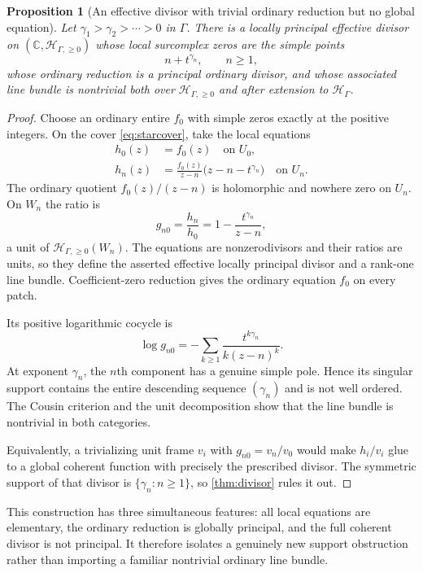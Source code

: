\documentclass[11pt,letterpaper]{article}
\newtheorem{proposition}[theorem]{Proposition}
\theoremstyle{definition}
\theoremstyle{remark}
\newcommand{\C}{\mathbb C}
\newcommand{\HH}{\mathscr H_\Gamma}
\newcommand{\HA}{\mathscr H_{\Gamma,\ge0}}
\numberwithin{equation}{section}
\begin{document}
\begin{proposition}[An effective divisor with trivial ordinary reduction but no global equation]\label{prop:Cartierexample}
Let $\gamma_1>\gamma_2>\cdots>0$ in $\Gamma$. There is a locally principal effective divisor on $(\C,\HA)$ whose local surcomplex zeros are the simple points
\[
 n+t^{\gamma_n},\qquad n\ge1,
\]
whose ordinary reduction is a principal ordinary divisor, and whose associated line bundle is nontrivial both over $\HA$ and after extension to $\HH$.
\end{proposition}
\begin{proof}
Choose an ordinary entire $f_0$ with simple zeros exactly at the positive integers. On the cover \eqref{eq:starcover}, take the local equations
\begin{align*}
 h_0(z)&=f_0(z)\quad\text{on }U_0,\\
 h_n(z)&=\frac{f_0(z)}{z-n}\bigl(z-n-t^{\gamma_n}\bigr)
 \quad\text{on }U_n.
\end{align*}
The ordinary quotient $f_0(z)/(z-n)$ is holomorphic and nowhere zero on $U_n$. On $W_n$ the ratio is
\begin{equation}\label{eq:divisortransition}
 g_{n0}=\frac{h_n}{h_0}=1-\frac{t^{\gamma_n}}{z-n},
\end{equation}
a unit of $\HA(W_n)$. The equations are nonzerodivisors and their ratios are units, so they define the asserted effective locally principal divisor and a rank-one line bundle. Coefficient-zero reduction gives the ordinary equation $f_0$ on every patch.

Its positive logarithmic cocycle is
\begin{equation}\label{eq:divisorlog}
 \log g_{n0}=-\sum_{k\ge1}
 \frac{t^{k\gamma_n}}{k(z-n)^k}.
\end{equation}
At exponent $\gamma_n$, the $n$th component has a genuine simple pole. Hence its singular support contains the entire descending sequence $(\gamma_n)$ and is not well ordered. The Cousin criterion and the unit decomposition show that the line bundle is nontrivial in both categories.

Equivalently, a trivializing unit frame $v_i$ with $g_{n0}=v_n/v_0$ would make $h_i/v_i$ glue to a global coherent function with precisely the prescribed divisor. The symmetric support of that divisor is $\{\gamma_n:n\ge1\}$, so \cref{thm:divisor} rules it out.
\end{proof}
This construction has three simultaneous features: all local equations are elementary, the ordinary reduction is globally principal, and the full coherent divisor is not principal. It therefore isolates a genuinely new support obstruction rather than importing a familiar nontrivial ordinary line bundle.
\end{document}
